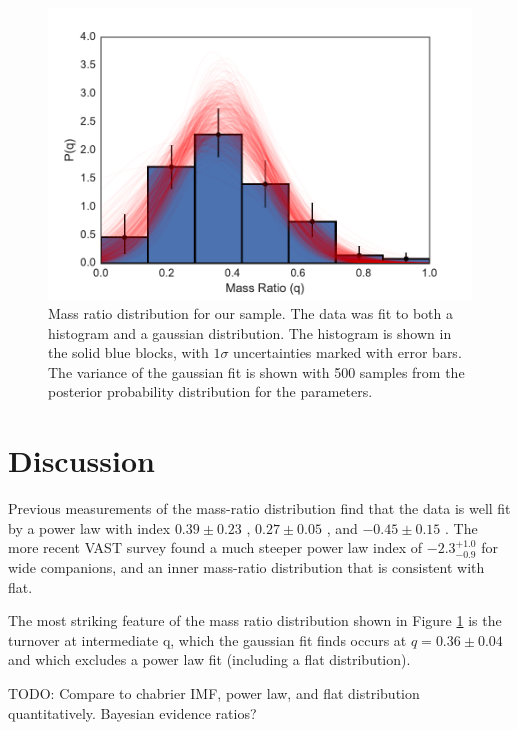 \documentclass{emulateapj}
\begin{document}
\begin{figure}
\includegraphics[width=\columnwidth]{MRD_normal.pdf}
\caption{Mass ratio distribution for our sample. The data was fit to both a histogram and a gaussian distribution. The histogram is shown in the solid blue blocks, with $1 \sigma$ uncertainties marked with error bars. The variance of the gaussian fit is shown with 500 samples from the posterior probability distribution for the parameters.}
\label{fig:mrd}
\end{figure}




\section{Discussion}
\label{sec:discussion}

Previous measurements of the mass-ratio distribution find that the data is well fit by a power law with index $0.39 \pm 0.23$ \citep[M dwarf stars][]{Delfosse2004}, $0.27 \pm 0.05$ \citep[Solar type stars][]{Duchene2013}, and $-0.45 \pm 0.15$ \citep[intermediate-mass stars][]{Kouwenhoven2007}. The more recent VAST survey found a much steeper power law index of $-2.3^{+1.0}_{-0.9}$ for wide companions, and an inner mass-ratio distribution that is consistent with flat.

The most striking feature of the mass ratio distribution shown in Figure \ref{fig:mrd} is the turnover at intermediate q, which the gaussian fit finds occurs at $q = 0.36 \pm 0.04$ and which excludes a power law fit (including a flat distribution). 

TODO: Compare to chabrier IMF, power law, and flat distribution quantitatively. Bayesian evidence ratios?
\end{document}
